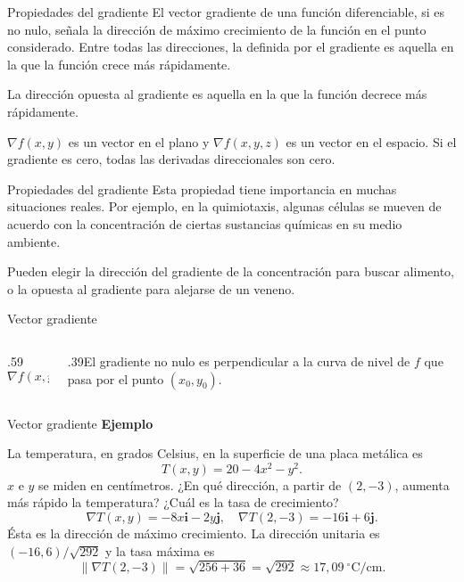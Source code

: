 \documentclass[main.tex]{subfiles}
\begin{document}
\begin{frame}{Propiedades del gradiente}
\small El vector gradiente de una función diferenciable, si es no nulo, señala la dirección de máximo crecimiento de la función en el punto considerado. Entre todas las direcciones, la definida por el gradiente es aquella en la que la función crece más rápidamente.
\medskip

La dirección opuesta al gradiente es aquella en la que la función decrece más rápidamente.
\medskip

$\nabla f(x,y)$ es un vector en el plano y $\nabla f(x,y,z)$ es un vector en el espacio. Si el gradiente es cero, todas las derivadas direccionales son cero.
\end{frame}
\begin{frame}{Propiedades del gradiente}
Esta propiedad tiene importancia en muchas situaciones reales. Por ejemplo, en la quimiotaxis, algunas células se mueven de acuerdo con la concentración de ciertas sustancias químicas en su medio ambiente.
\medskip

Pueden elegir la dirección del gradiente de la concentración para buscar alimento, o la opuesta al gradiente para alejarse de un veneno.
\end{frame}
\begin{frame}{Vector gradiente}
\begin{columns}[c]
\begin{column}{.59\textwidth}\[\nabla f(x,y)\]\end{column}
\begin{column}{.39\textwidth}El gradiente no nulo es perpendicular a la curva de nivel de $f$ que pasa por el punto $(x_0,y_0)$.\end{column}
\end{columns}
\end{frame}
\begin{frame}{Vector gradiente}
\small\textbf{Ejemplo}\par La temperatura, en grados Celsius, en la superficie de una placa metálica es
\[T(x,y)=20-4x^2-y^2.\]
$x$ e $y$ se miden en centímetros. ¿En qué dirección, a partir de $(2,-3)$, aumenta más rápido la temperatura? ¿Cuál es la tasa de crecimiento?
\[\nabla T(x,y)=-8x\mathbf i-2y\mathbf j,\quad\nabla T(2,-3)=-16\mathbf i+6\mathbf j.\]
Ésta es la dirección de máximo crecimiento. La dirección unitaria es $(-16,6)/\sqrt{292}$ y la tasa máxima es
\[\|\nabla T(2,-3)\|=\sqrt{256+36}=\sqrt{292}\approx17{,}09\ ^\circ\mathrm C/\mathrm{cm}.\]
\end{frame}
\end{document}
